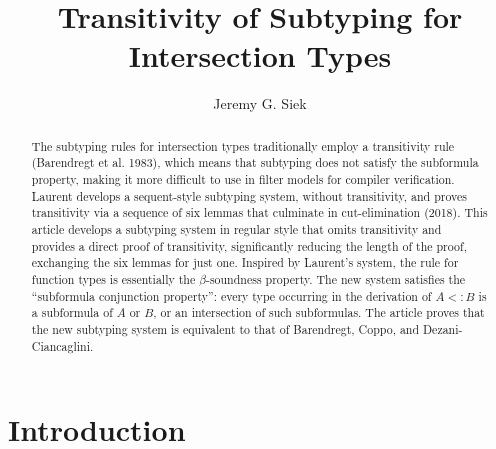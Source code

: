 \documentclass{article}
\title{Transitivity of Subtyping for Intersection Types}
\author{Jeremy G. Siek}
\begin{document}
\maketitle

\newcommand{\TOP}{\ensuremath{\mathtt{U}}}
\newcommand{\dom}[1]{\cap\mathsf{dom}(#1)}
\newcommand{\cod}[1]{\cap\mathsf{cod}(#1)}
\newcommand{\topP}[1]{\mathsf{top}(#1)}
\newcommand{\topInCod}[1]{\mathsf{topInCod}(#1)}
\newcommand{\depth}[1]{\mathsf{depth}(#1)}
\newcommand{\size}[1]{\mathsf{size}(#1)}
\newcommand{\inside}[0]{\inplus}
\newcommand{\containedin}[0]{\subsetpluseq}


\begin{abstract}
The subtyping rules for intersection types traditionally employ a
transitivity rule (Barendregt et al. 1983), which means that
subtyping does not satisfy the subformula property, making it more
difficult to use in filter models for compiler verification.
Laurent develops a sequent-style subtyping system, without
transitivity, and proves transitivity via a sequence of six lemmas
that culminate in cut-elimination (2018). This article develops a
subtyping system in regular style that omits transitivity and
provides a direct proof of transitivity, significantly reducing the
length of the proof, exchanging the six lemmas for just
one. Inspired by Laurent's system, the rule for function types is
essentially the $\beta$-soundness property.  The new system
satisfies the ``subformula conjunction property'': every type
occurring in the derivation of $A <: B$ is a subformula of $A$ or
$B$, or an intersection of such subformulas. The article proves that
the new subtyping system is equivalent to that of Barendregt, Coppo,
and Dezani-Ciancaglini.
\end{abstract}

\section{Introduction}
\end{document}
